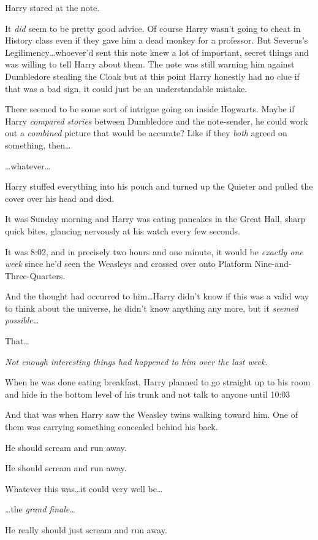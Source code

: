 Harry stared at the note.

It \emph{did} seem to be pretty good advice. Of course Harry wasn’t going to cheat in History class even if they gave him a dead monkey for a professor. But Severus’s Legilimency…whoever’d sent this note knew a lot of important, secret things and was willing to tell Harry about them. The note was still warning him against Dumbledore stealing the Cloak but at this point Harry honestly had no clue if that was a bad sign, it could just be an understandable mistake.

There seemed to be some sort of intrigue going on inside Hogwarts. Maybe if Harry \emph{compared stories} between Dumbledore and the note-sender, he could work out a \emph{combined} picture that would be accurate? Like if they \emph{both} agreed on something, then…

…whatever…

Harry stuffed everything into his pouch and turned up the Quieter and pulled the cover over his head and died.

\later

It was Sunday morning and Harry was eating pancakes in the Great Hall, sharp quick bites, glancing nervously at his watch every few seconds.

It was 8:02\am, and in precisely two hours and one minute, it would be \emph{exactly one week} since he’d seen the Weasleys and crossed over onto Platform Nine-and-Three-Quarters.

And the thought had occurred to him…Harry didn’t know if this was a valid way to think about the universe, he didn’t know anything any more, but it \emph{seemed possible…}

That…

\emph{Not enough interesting things had happened to him over the last week.}

When he was done eating breakfast, Harry planned to go straight up to his room and hide in the bottom level of his trunk and not talk to anyone until 10:03\am

And that was when Harry saw the Weasley twins walking toward him. One of them was carrying something concealed behind his back.

He should scream and run away.

He should scream and run away.

Whatever this was…it could very well be…

…the \emph{grand finale…}

He really should just scream and run away.

